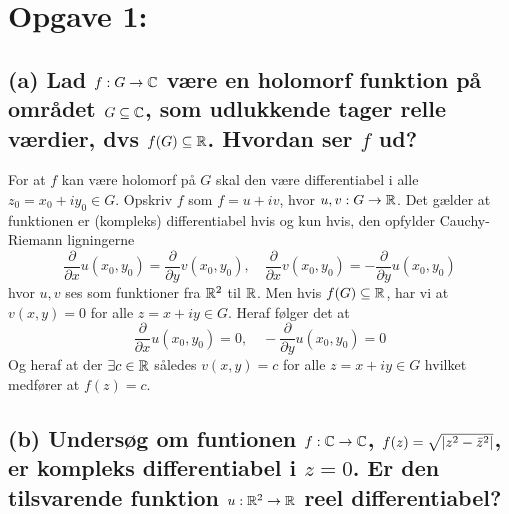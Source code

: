 \section{Opgave 1:}

\subsection*{(a) Lad $f: G \to \mathbb{C}$ være en holomorf funktion på området $G \subseteq \mathbb{C}$, som udlukkende tager relle værdier, dvs $f(G) \subseteq \mathbb{R}$. Hvordan ser $f$ ud? }
For at $f$ kan være holomorf på $G$ skal den være differentiabel i alle $z_{0} = x_{0} + iy_{0} \in G$. Opskriv $f$ som $f = u + iv$, hvor $u, v: G \to \mathbb{R}$. Det gælder at funktionen er (kompleks) differentiabel hvis og kun hvis, den opfylder Cauchy-Riemann ligningerne
\begin{equation*}
  \frac{\partial}{\partial x}u(x_{0}, y_{0}) = \frac{\partial}{\partial y} v(x_{0}, y_{0}), \quad \frac{\partial}{\partial x} v(x_{0}, y_{0}) = -\frac{\partial}{\partial y} u(x_{0}, y_{0})
\end{equation*}
hvor $u, v$ ses som funktioner fra $\mathbb{R}^{2}$ til $\mathbb{R}$.
Men hvis $f(G) \subseteq \mathbb{R}$, har vi at $v(x, y) = 0$ for alle $z = x + iy \in G$. Heraf følger det at
\begin{equation*}
  \frac{\partial}{\partial x}u(x_{0}, y_{0}) = 0, \quad -\frac{\partial}{\partial y} u(x_{0}, y_{0}) = 0
\end{equation*}
Og heraf at der $\exists c \in \mathbb{R}$ således $v(x, y) = c$ for alle $z = x + iy \in G$ hvilket medfører at $f(z) = c$.



\subsection*{(b) Undersøg om funtionen $f: \mathbb{C} \to \mathbb{C}$, $f(z) = \sqrt{\left|z^{2} - \bar{z}^{2}\right|}$, er kompleks differentiabel i $z = 0$. Er den tilsvarende funktion $u: \mathbb{R}^{2} \to \mathbb{R}$ reel differentiabel?
}
